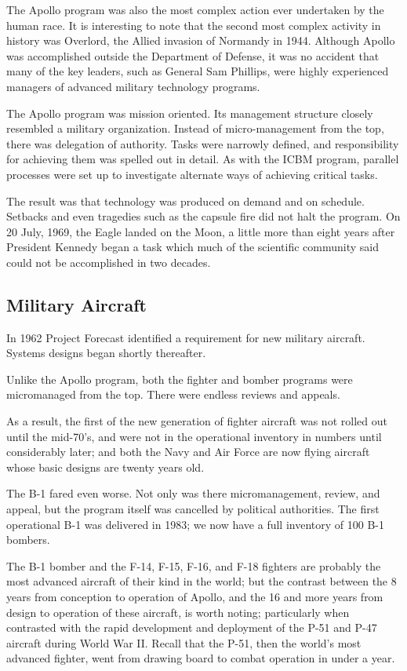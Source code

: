 \documentclass[a4paper,12pt]{book}
\begin{document}
The Apollo program was also the most complex action ever undertaken by the human race. It is interesting to note that the second most complex activity in history was Overlord, the Allied invasion of Normandy in 1944. Although Apollo was accomplished outside the Department of Defense, it was no accident that many of the key leaders, such as General Sam Phillips, were highly experienced managers of advanced military technology programs.

The Apollo program was mission oriented. Its management structure closely resembled a military organization. Instead of micro-management from the top, there was delegation of authority. Tasks were narrowly defined, and responsibility for achieving them was spelled out in detail. As with the ICBM program, parallel processes were set up to investigate alternate ways of achieving critical tasks.

The result was that technology was produced on demand and on schedule. Setbacks and even tragedies such as the capsule fire did not halt the program. On 20 July, 1969, the Eagle landed on the Moon, a little more than eight years after President Kennedy began a task which much of the scientific community said could not be accomplished in two decades.

\subsection{Military Aircraft}
In 1962 Project Forecast identified a requirement for new military aircraft. Systems designs began shortly thereafter.

Unlike the Apollo program, both the fighter and bomber programs were micromanaged from the top. There were endless reviews and appeals.

As a result, the first of the new generation of fighter aircraft was not rolled out until the mid-70's, and were not in the operational inventory in numbers until considerably later; and both the Navy and Air Force are now flying aircraft whose basic designs are twenty years old.

The B-1 fared even worse. Not only was there micromanagement, review, and appeal, but the program itself was cancelled by political authorities. The first operational B-1 was delivered in 1983; we now have a full inventory of 100 B-1 bombers.

The B-1 bomber and the F-14, F-15, F-16, and F-18 fighters are probably the most advanced aircraft of their kind in the world; but the contrast between the 8 years from conception to operation of Apollo, and the 16 and more years from design to operation of these aircraft, is worth noting; particularly when contrasted with the rapid development and deployment of the P-51 and P-47 aircraft during World War II. Recall that the P-51, then the world's most advanced fighter, went from drawing board to combat operation in under a year.
\end{document}

